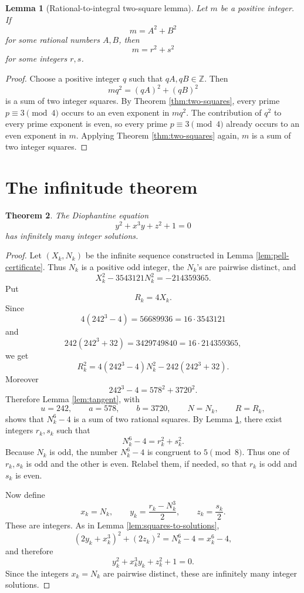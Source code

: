 \documentclass[11pt]{article}
\newtheorem{theorem}{Theorem}[section]
\newtheorem{lemma}[theorem]{Lemma}
\theoremstyle{remark}
\begin{document}
\begin{lemma}[Rational-to-integral two-square lemma]\label{lem:rational-to-integral}
Let \(m\) be a positive integer.  If
\[
        m=A^2+B^2
\]
for some rational numbers \(A,B\), then
\[
        m=r^2+s^2
\]
for some integers \(r,s\).
\end{lemma}

\begin{proof}
Choose a positive integer \(q\) such that \(qA,qB\in\mathbb Z\).  Then
\[
        mq^2=(qA)^2+(qB)^2
\]
is a sum of two integer squares.  By Theorem \ref{thm:two-squares}, every prime
\(p\equiv3\pmod4\) occurs to an even exponent in \(mq^2\).  The contribution of
\(q^2\) to every prime exponent is even, so every prime \(p\equiv3\pmod4\)
already occurs to an even exponent in \(m\).  Applying Theorem
\ref{thm:two-squares} again, \(m\) is a sum of two integer squares.
\end{proof}

\section{The infinitude theorem}

\begin{theorem}\label{thm:main}
The Diophantine equation
\[
        y^2+x^3y+z^2+1=0
\]
has infinitely many integer solutions.
\end{theorem}

\begin{proof}
Let \((X_k,N_k)\) be the infinite sequence constructed in Lemma
\ref{lem:pell-certificate}.  Thus \(N_k\) is a positive odd integer, the
\(N_k\)'s are pairwise distinct, and
\[
        X_k^2-3543121N_k^2=-214359365.
\]
Put
\[
        R_k=4X_k.
\]
Since
\[
        4(242^3-4)=56689936=16\cdot3543121
\]
and
\[
        242(242^3+32)=3429749840=16\cdot214359365,
\]
we get
\[
        R_k^2=4(242^3-4)N_k^2-242(242^3+32).
\]
Moreover
\[
        242^3-4=578^2+3720^2.
\]
Therefore Lemma \ref{lem:tangent}, with
\[
        u=242,
        \qquad a=578,
        \qquad b=3720,
        \qquad N=N_k,
        \qquad R=R_k,
\]
shows that \(N_k^6-4\) is a sum of two rational squares.
By Lemma \ref{lem:rational-to-integral}, there exist integers \(r_k,s_k\) such
that
\[
        N_k^6-4=r_k^2+s_k^2.
\]
Because \(N_k\) is odd, the number \(N_k^6-4\) is congruent to \(5\pmod8\).
Thus one of \(r_k,s_k\) is odd and the other is even.  Relabel them, if needed,
so that \(r_k\) is odd and \(s_k\) is even.

Now define
\[
        x_k=N_k,
        \qquad
        y_k=\frac{r_k-N_k^3}{2},
        \qquad
        z_k=\frac{s_k}{2}.
\]
These are integers.  As in Lemma \ref{lem:squares-to-solutions},
\[
        (2y_k+x_k^3)^2+(2z_k)^2=N_k^6-4=x_k^6-4,
\]
and therefore
\[
        y_k^2+x_k^3y_k+z_k^2+1=0.
\]
Since the integers \(x_k=N_k\) are pairwise distinct, these are infinitely many
integer solutions.
\end{proof}
\end{document}
